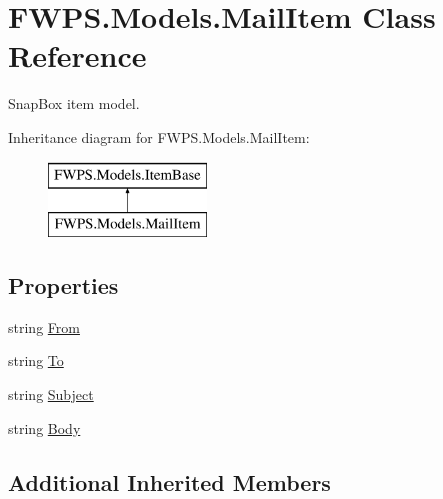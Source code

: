 \hypertarget{class_f_w_p_s_1_1_models_1_1_mail_item}{}\section{F\+W\+P\+S.\+Models.\+Mail\+Item Class Reference}
\label{class_f_w_p_s_1_1_models_1_1_mail_item}


Snap\+Box item model.  


Inheritance diagram for F\+W\+P\+S.\+Models.\+Mail\+Item\+:\begin{figure}[H]
\begin{center}
\leavevmode
\includegraphics[height=2.000000cm]{class_f_w_p_s_1_1_models_1_1_mail_item}
\end{center}
\end{figure}
\subsection*{Properties}
\begin{DoxyCompactItemize}
\item 
string \mbox{\hyperlink{class_f_w_p_s_1_1_models_1_1_mail_item_a79024cc5a2bf21b5e544963a1d15d554}{From}}
\item 
string \mbox{\hyperlink{class_f_w_p_s_1_1_models_1_1_mail_item_a16e6102afe35c63df63af9968930577a}{To}}
\item 
string \mbox{\hyperlink{class_f_w_p_s_1_1_models_1_1_mail_item_aa86a8d48ac160405f8a45f2b9ee4bfed}{Subject}}
\item 
string \mbox{\hyperlink{class_f_w_p_s_1_1_models_1_1_mail_item_a899aeac2dd37f64cb46b28ec60f7ea19}{Body}}
\end{DoxyCompactItemize}
\subsection*{Additional Inherited Members}


